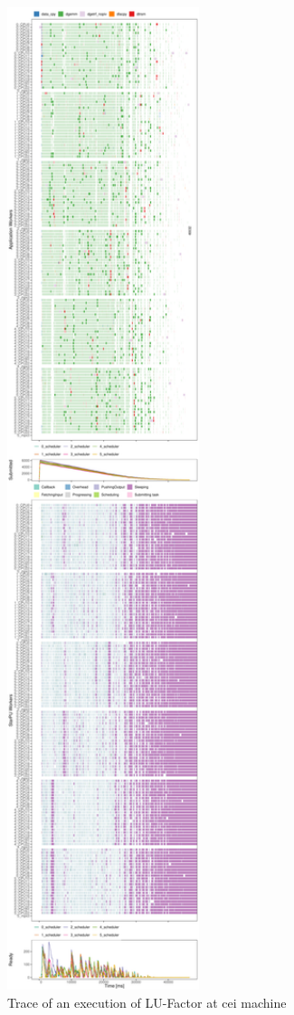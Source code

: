 \documentclass[conference, 10pt, final]{IEEEtran}
\begin{document}
\begin{figure}[ht]
\centering
\includegraphics[width=0.5\textwidth]{719424.pdf}
\caption{Trace of an execution of LU-Factor at cei machine}
\label{fig:trace}
\end{figure}
\end{document}
